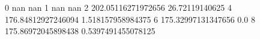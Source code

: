 0 nan nan
1 nan nan
2 202.05116271972656 26.72119140625
4 176.84812927246094 1.518157958984375
6 175.32997131347656 0.0
8 175.86972045898438 0.5397491455078125
